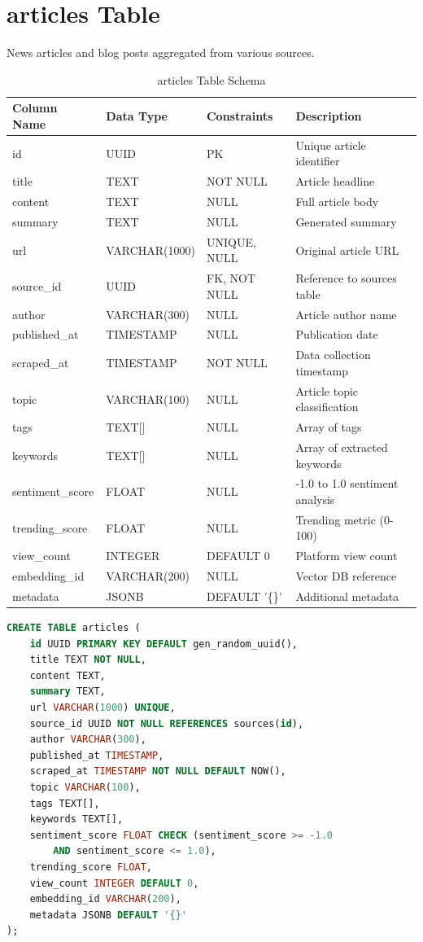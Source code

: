\documentclass[12pt,a4paper]{report}
\begin{document}
\newpage
\section{articles Table}

News articles and blog posts aggregated from various sources.

\begin{table}[h]
\centering
\small
\caption{articles Table Schema}
\begin{tabular}{|l|l|l|l|}
\toprule
\textbf{Column Name} & \textbf{Data Type} & \textbf{Constraints} & \textbf{Description} \\
\midrule
id & UUID & PK & Unique article identifier \\
title & TEXT & NOT NULL & Article headline \\
content & TEXT & NULL & Full article body \\
summary & TEXT & NULL & Generated summary \\
url & VARCHAR(1000) & UNIQUE, NULL & Original article URL \\
source\_id & UUID & FK, NOT NULL & Reference to sources table \\
author & VARCHAR(300) & NULL & Article author name \\
published\_at & TIMESTAMP & NULL & Publication date \\
scraped\_at & TIMESTAMP & NOT NULL & Data collection timestamp \\
topic & VARCHAR(100) & NULL & Article topic classification \\
tags & TEXT[] & NULL & Array of tags \\
keywords & TEXT[] & NULL & Array of extracted keywords \\
sentiment\_score & FLOAT & NULL & -1.0 to 1.0 sentiment analysis \\
trending\_score & FLOAT & NULL & Trending metric (0-100) \\
view\_count & INTEGER & DEFAULT 0 & Platform view count \\
embedding\_id & VARCHAR(200) & NULL & Vector DB reference \\
metadata & JSONB & DEFAULT '\{\}' & Additional metadata \\
\bottomrule
\end{tabular}
\end{table}

\begin{lstlisting}[language=SQL,basicstyle=\ttfamily\small]
CREATE TABLE articles (
    id UUID PRIMARY KEY DEFAULT gen_random_uuid(),
    title TEXT NOT NULL,
    content TEXT,
    summary TEXT,
    url VARCHAR(1000) UNIQUE,
    source_id UUID NOT NULL REFERENCES sources(id),
    author VARCHAR(300),
    published_at TIMESTAMP,
    scraped_at TIMESTAMP NOT NULL DEFAULT NOW(),
    topic VARCHAR(100),
    tags TEXT[],
    keywords TEXT[],
    sentiment_score FLOAT CHECK (sentiment_score >= -1.0 
        AND sentiment_score <= 1.0),
    trending_score FLOAT,
    view_count INTEGER DEFAULT 0,
    embedding_id VARCHAR(200),
    metadata JSONB DEFAULT '{}'
);
\end{lstlisting}
\end{document}
